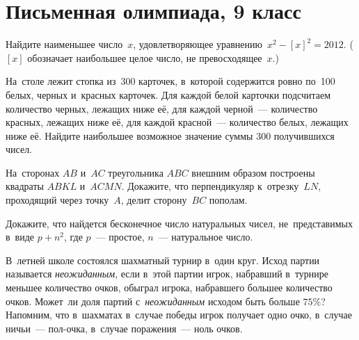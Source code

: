 

\section*{Письменная олимпиада, 9 класс}


\begin{problems}

\item
Найдите наименьшее число~$x$, удовлетворяющее уравнению~$x^2 - [x]^2 = 2012$.
($[x]$ обозначает наибольшее целое число, не превосходящее~$x$.)

\item
На~столе лежит стопка из~300 карточек, в~которой содержится ровно по~100 белых,
черных и~красных карточек.
Для каждой белой карточки подсчитаем количество черных, лежащих ниже её,
для каждой черной~--- количество красных, лежащих ниже её,
для каждой красной~--- количество белых, лежащих ниже её.
Найдите наибольшее возможное значение суммы 300 получившихся чисел.

\item
На~сторонах $AB$ и~$AC$ треугольника $ABC$ внешним образом построены квадраты
$ABKL$ и~$ACMN$.
Докажите, что перпендикуляр к~отрезку~$LN$, проходящий через точку~$A$, делит
сторону~$BC$ пополам.

\item
Докажите, что найдется бесконечное число натуральных чисел, не~представимых
в~виде $p + n^2$, где $p$~--- простое, $n$~--- натуральное число.

\item
В~летней школе состоялся шахматный турнир в~один круг.
Исход партии называется \emph{неожиданным}, если в~этой партии игрок, набравший
в~турнире меньшее количество очков, обыграл игрока, набравшего большее
количество очков.
Может~ли доля партий с~\emph{неожиданным} исходом быть больше $75\%$?
Напомним, что в~шахматах в~случае победы игрок получает одно очко, в~случае
ничьи~--- пол-очка, в~случае поражения~--- ноль очков.

\end{problems}

